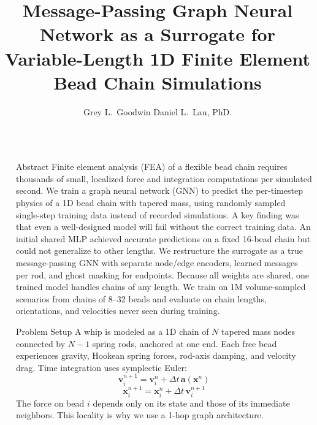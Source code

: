 \documentclass[final]{beamer}
\title{Message-Passing Graph Neural Network as a Surrogate for Variable-Length 1D Finite Element Bead Chain Simulations}
\author{Grey L.~Goodwin \quad\textbf{\textperiodcentered}\quad Daniel L.~Lau, PhD.}
\newlength{\sepwidth}
\newlength{\colwidth}
\newcommand{\separatorcolumn}{\begin{column}{\sepwidth}\end{column}}
\begin{document}
\begin{frame}[t]
\begin{columns}[t]
\separatorcolumn

\begin{column}{\colwidth}

  \begin{block}{Abstract}
    Finite element analysis (FEA) of a flexible bead chain requires
    thousands of small, localized force and integration computations per
    simulated second. We train a graph neural network (GNN) to predict the
    per-timestep physics of a 1D bead chain with tapered mass, using
    randomly sampled single-step training data instead of recorded
    simulations. A key finding was that even a well-designed model will
    fail without the correct training data. An initial shared MLP achieved
    accurate predictions on a fixed 16-bead chain but could not generalize
    to other lengths. We restructure the surrogate as a true
    message-passing GNN with separate node/edge encoders, learned messages
    per rod, and ghost masking for endpoints. Because all weights are
    shared, one trained model handles chains of any length. We train on 1M
    volume-sampled scenarios from chains of 8--32 beads and evaluate on
    chain lengths, orientations, and velocities never seen during training.
  \end{block}

  \begin{block}{Problem Setup}
    A whip is modeled as a 1D chain of $N$ tapered mass nodes connected
    by $N-1$ spring rods, anchored at one end. Each free bead experiences
    gravity, Hookean spring forces, rod-axis damping, and velocity drag.
    Time integration uses symplectic Euler:
    \begin{equation}
        \mathbf{v}_i^{n+1} = \mathbf{v}_i^n + \Delta t \, \mathbf{a}(\mathbf{x}^n)
    \end{equation}
    \begin{equation}
        \mathbf{x}_i^{n+1} = \mathbf{x}_i^n + \Delta t \, \mathbf{v}_i^{n+1}
    \end{equation}
    The force on bead $i$ depends only on its state and those of its
    immediate neighbors. This locality is why we use a 1-hop graph
    architecture.
  \end{block}


\end{column}
\end{columns}
\end{frame}
\end{document}
